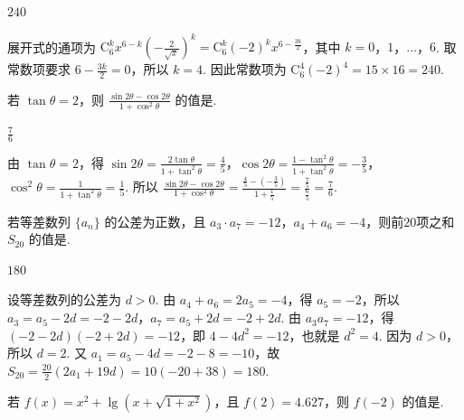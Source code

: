 \documentclass[UTF8,a4paper,oneside,11pt]{ctexbook}
\begin{document}
\begin{answer}
\(240\)
\end{answer}

\begin{solution}
展开式的通项为 \(\mathrm C_6^k x^{6-k}\left(-\frac{2}{\sqrt{x}}\right)^k=\mathrm C_6^k(-2)^k x^{6-\frac{3k}{2}}\)，其中 \(k=0\)，\(1\)，\(\ldots\)，\(6\). 取常数项要求 \(6-\frac{3k}{2}=0\)，所以 \(k=4\). 因此常数项为 \(\mathrm C_6^4(-2)^4=15\times16=240\).
\end{solution}


\begin{problem}

若 \(\tan \theta = 2\)，则 \(\frac{\sin 2\theta - \cos 2\theta}{1 + \cos^2 \theta}\) 的值是\fillinblank{}.
\end{problem}

\begin{answer}
\(\frac{7}{6}\)
\end{answer}

\begin{solution}
由 \(\tan\theta=2\)，得 \(\sin2\theta=\frac{2\tan\theta}{1+\tan^2\theta}=\frac45\)，\(\cos2\theta=\frac{1-\tan^2\theta}{1+\tan^2\theta}=-\frac35\)，\(\cos^2\theta=\frac{1}{1+\tan^2\theta}=\frac15\). 所以
\(
\frac{\sin2\theta-\cos2\theta}{1+\cos^2\theta}=\frac{\frac45-\left(-\frac35\right)}{1+\frac15}=\frac{\frac75}{\frac65}=\frac76
\).
\end{solution}


\begin{problem}

若等差数列 \(\{a_{n}\}\) 的公差为正数，且 \(a_{3} \cdot a_{7} = -12\)，\(a_{4} + a_{6} = -4\)，则前\(20\)项之和 \(S_{20}\) 的值是\fillinblank{}.
\end{problem}

\begin{answer}
\(180\)
\end{answer}

\begin{solution}
设等差数列的公差为 \(d>0\). 由 \(a_4+a_6=2a_5=-4\)，得 \(a_5=-2\)，所以 \(a_3=a_5-2d=-2-2d\)，\(a_7=a_5+2d=-2+2d\). 由 \(a_3a_7=-12\)，得 \((-2-2d)(-2+2d)=-12\)，即 \(4-4d^2=-12\)，也就是 \(d^2=4\). 因为 \(d>0\)，所以 \(d=2\). 又 \(a_1=a_5-4d=-2-8=-10\)，故 \(S_{20}=\frac{20}{2}(2a_1+19d)=10(-20+38)=180\).
\end{solution}


\begin{problem}

若 \(f(x)=x^{2}+\lg\left(x+\sqrt{1+x^{2}}\right)\)，且 \(f(2)=4.627\)，则 \(f(-2)\) 的值是\fillinblank{}.
\end{problem}
\end{document}
